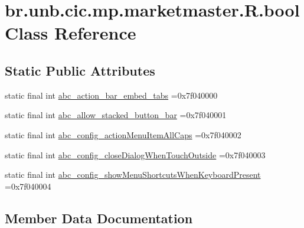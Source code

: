 \hypertarget{classbr_1_1unb_1_1cic_1_1mp_1_1marketmaster_1_1R_1_1bool}{}\section{br.\+unb.\+cic.\+mp.\+marketmaster.\+R.\+bool Class Reference}
\label{classbr_1_1unb_1_1cic_1_1mp_1_1marketmaster_1_1R_1_1bool}
\subsection*{Static Public Attributes}
\begin{DoxyCompactItemize}
\item 
static final int \mbox{\hyperlink{classbr_1_1unb_1_1cic_1_1mp_1_1marketmaster_1_1R_1_1bool_a537ebdac56d4f678f732548e5184e22c}{abc\+\_\+action\+\_\+bar\+\_\+embed\+\_\+tabs}} =0x7f040000
\item 
static final int \mbox{\hyperlink{classbr_1_1unb_1_1cic_1_1mp_1_1marketmaster_1_1R_1_1bool_a0faa95bd9d2018b0d4ba97855804e9c0}{abc\+\_\+allow\+\_\+stacked\+\_\+button\+\_\+bar}} =0x7f040001
\item 
static final int \mbox{\hyperlink{classbr_1_1unb_1_1cic_1_1mp_1_1marketmaster_1_1R_1_1bool_af55fee2577029988067887fe057ebb2b}{abc\+\_\+config\+\_\+action\+Menu\+Item\+All\+Caps}} =0x7f040002
\item 
static final int \mbox{\hyperlink{classbr_1_1unb_1_1cic_1_1mp_1_1marketmaster_1_1R_1_1bool_a14b1391ad92fd117611f8ca0352a777f}{abc\+\_\+config\+\_\+close\+Dialog\+When\+Touch\+Outside}} =0x7f040003
\item 
static final int \mbox{\hyperlink{classbr_1_1unb_1_1cic_1_1mp_1_1marketmaster_1_1R_1_1bool_a716402bad923f6498de076652765f785}{abc\+\_\+config\+\_\+show\+Menu\+Shortcuts\+When\+Keyboard\+Present}} =0x7f040004
\end{DoxyCompactItemize}


\subsection{Member Data Documentation}
\mbox{\label{classbr_1_1unb_1_1cic_1_1mp_1_1marketmaster_1_1R_1_1bool_a537ebdac56d4f678f732548e5184e22c}} 
